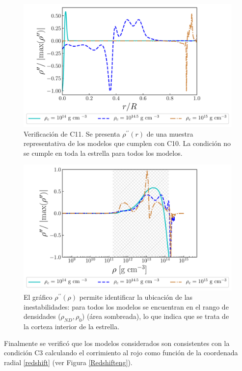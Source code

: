 \begin{figure}[H]
    \centering
    \includegraphics[width=0.93\linewidth]{figures/ConvecStabilityeng.pdf}
    \caption{Verificación de C11. Se presenta $\rho^{\prime\prime}(r)$ de una muestra representativa de los modelos que cumplen con C10. La condición no se cumple en toda la estrella para todos los modelos. }
    \label{ConvecStabilityeng}
\end{figure}
\begin{figure}[H]
    \centering
    \includegraphics[width=0.93\linewidth]{figures/ConvecStabilityengCorrel.pdf}
    \caption{El gráfico $\rho^{\prime\prime}(\rho)$ permite identificar la ubicación de las inestabilidades: para todos los modelos se encuentran en el rango de densidades ($\rho_{ND},\rho_0$) (área sombreada), lo que indica que se trata de la corteza interior de la estrella.} 
    \label{ConvecStabilityengCorrel}
\end{figure}

Finalmente se verificó que los modelos considerados son consistentes con la condición C3 calculando el corrimiento al rojo como función de la coordenada radial \eqref{redshift} (ver Figura \ref{Redshifteng}). 

